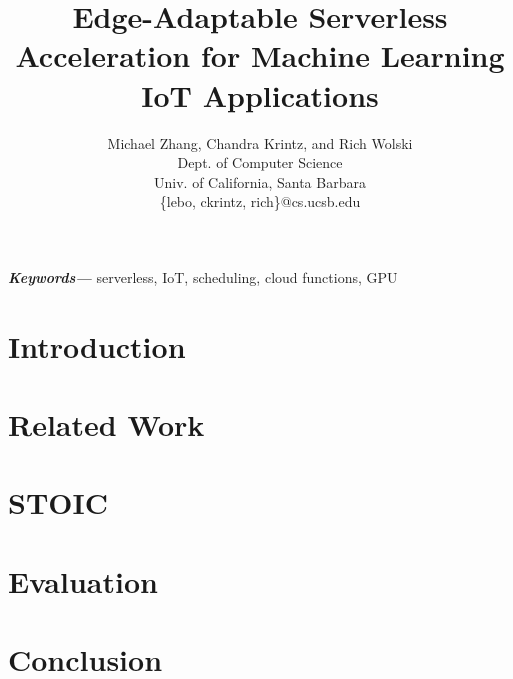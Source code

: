 \documentclass[12pt, onecolumn]{article}
\title{Edge-Adaptable Serverless Acceleration for Machine Learning IoT Applications}
\author{Michael Zhang, Chandra Krintz, and  Rich Wolski \\
        \small Dept. of Computer Science \\
        \small Univ. of California, Santa Barbara \\
        \small \{lebo, ckrintz, rich\}@cs.ucsb.edu \\
}
\date{} %
\providecommand{\keywords}[1]
{
  \small	
  \textbf{\textit{Keywords---}} #1
}
\begin{document}
\maketitle

\begin{abstract}
\label{sec:abstract}

\end{abstract}

\keywords{serverless, IoT, scheduling, cloud functions, GPU}



\section{Introduction}
\label{sec:intro}


\section{Related Work}
\label{sec:related}


\section{STOIC}
\label{sec:stoic}


\section{Evaluation}
\label{sec:results}


\section{Conclusion}
\label{sec:conc}








\end{document}
